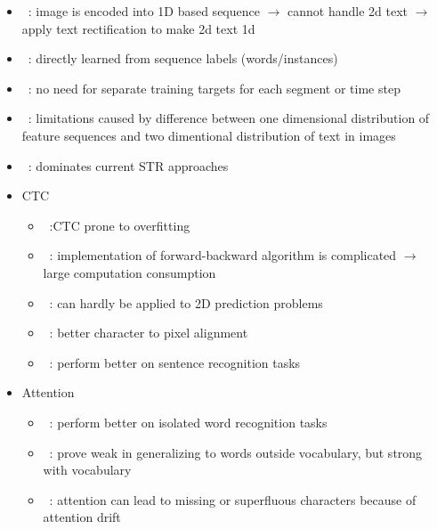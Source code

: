 \begin{itemize}
\begin{itemize}
            \item~\cite{cheng_aon_2018}: image is encoded into 1D based sequence
                $\rightarrow$ cannot handle 2d text
                $\rightarrow$ apply text rectification to make 2d text 1d
            \item~\cite{shi_end--end_2017}: directly learned from sequence labels (words/instances)
            \item~\cite{xie_aggregation_2019}: no need for separate training targets for each segment
                or time step
            \item~\cite{liao_scene_2018}: limitations caused by difference between one dimensional
                distribution of feature sequences and two dimentional distribution of text in
                images
            \item~\cite{liao_scene_2018}: dominates current \ac{STR} approaches
            \item CTC
                \begin{itemize}
                    \item~\cite{chen_text_2021}:CTC prone to overfitting
                    \item~\cite{xie_aggregation_2019}: implementation of forward-backward algorithm
                        is complicated $\rightarrow$ large computation consumption
                    \item~\cite{cheng_focusing_2017,xie_aggregation_2019}: can hardly be applied
                        to 2D prediction problems
                    \item~\cite{long_scene_2021}: better character to pixel alignment
                    \item~\cite{cong_comparative_2019}: perform better on sentence recognition tasks
                \end{itemize}
            \item Attention
                \begin{itemize}
                    \item~\cite{cong_comparative_2019}: perform better on isolated word recognition
                        tasks
                    \item~\cite{wan_vocabulary_2020}: prove weak in generalizing to words
                        outside vocabulary, but strong with vocabulary
                    \item~\cite{bai_edit_2018}: attention can lead to missing or superfluous
                        characters because of attention drift

\end{itemize}
\end{itemize}
\end{itemize}
